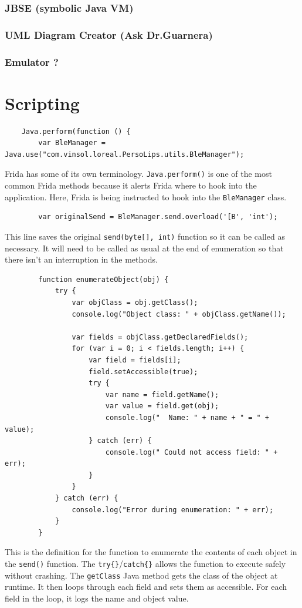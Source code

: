 \subsubsection{JBSE (symbolic Java VM)}
\subsubsection{UML Diagram Creator (Ask Dr.Guarnera)}
\subsubsection{Emulator ?}

\section{Scripting}
\begin{lstlisting}
	Java.perform(function () {
		var BleManager = Java.use("com.vinsol.loreal.PersoLips.utils.BleManager");
	\end{lstlisting}
	Frida has some of its own terminology. \texttt{Java.perform()} is one of the most common Frida methods because it alerts Frida where to hook into the application. Here, Frida is being instructed to hook into the \texttt{BleManager} class.
	
	\begin{lstlisting}
		var originalSend = BleManager.send.overload('[B', 'int');
	\end{lstlisting}
	This line saves the original \texttt{send(byte[], int)} function so it can be called as necessary. It will need to be called as usual at the end of enumeration so that there isn’t an interruption in the methods.
	
	\begin{lstlisting}
		function enumerateObject(obj) {
			try {
				var objClass = obj.getClass();
				console.log("Object class: " + objClass.getName());
				
				var fields = objClass.getDeclaredFields();
				for (var i = 0; i < fields.length; i++) {
					var field = fields[i];
					field.setAccessible(true);
					try {
						var name = field.getName();
						var value = field.get(obj);
						console.log("  Name: " + name + " = " + value);
					} catch (err) {
						console.log(" Could not access field: " + err);
					}
				}
			} catch (err) {
				console.log("Error during enumeration: " + err);
			}
		}
	\end{lstlisting}
	This is the definition for the function to enumerate the contents of each object in the \texttt{send()} function. The \texttt{try\{\}}/\texttt{catch\{\}} allows the function to execute safely without crashing. The \texttt{getClass} Java method gets the class of the object at runtime. It then loops through each field and sets them as accessible. For each field in the loop, it logs the name and object value.
	
